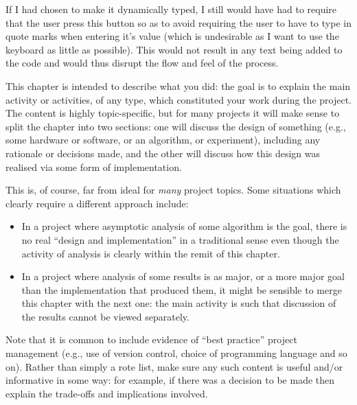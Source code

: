 \documentclass[ %
                    author={Jonathan Rankin},
                supervisor={Dr. David May, Dr. Ian Holyer},
                    degree={MEng},
                     title={CodeTouch},
                  subtitle={A Revolutionary Way To Program Real Code On Touch Screen Devices},
                      type={enterprise},
                      year={2015 } ]{dissertation}
\begin{document}
\begin{enumerate}
If I had chosen to make it dynamically typed, I still would have had to require that the user press this button so as to avoid requiring the user to have to type in quote marks when entering it's value (which is undesirable as I want to use the keyboard as little as possible). This would not result in any text being added to the code and would thus disrupt the flow and feel of the process. 


\noindent
This chapter is intended to describe what you did: the goal is to explain
the main activity or activities, of any type, which constituted your work 
during the project.  The content is highly topic-specific, but for many 
projects it will make sense to split the chapter into two sections: one 
will discuss the design of something (e.g., some hardware or software, or 
an algorithm, or experiment), including any rationale or decisions made, 
and the other will discuss how this design was realised via some form of 
implementation.  

This is, of course, far from ideal for {\em many} project topics.  Some
situations which clearly require a different approach include:

\begin{itemize}
\item In a project where asymptotic analysis of some algorithm is the goal,
      there is no real ``design and implementation'' in a traditional sense
      even though the activity of analysis is clearly within the remit of
      this chapter.
\item In a project where analysis of some results is as major, or a more
      major goal than the implementation that produced them, it might be
      sensible to merge this chapter with the next one: the main activity 
      is such that discussion of the results cannot be viewed separately.
\end{itemize}

\noindent
Note that it is common to include evidence of ``best practice'' project 
management (e.g., use of version control, choice of programming language 
and so on).  Rather than simply a rote list, make sure any such content 
is useful and/or informative in some way: for example, if there was a 
decision to be made then explain the trade-offs and implications 
involved.


\end{enumerate}
\end{document}
